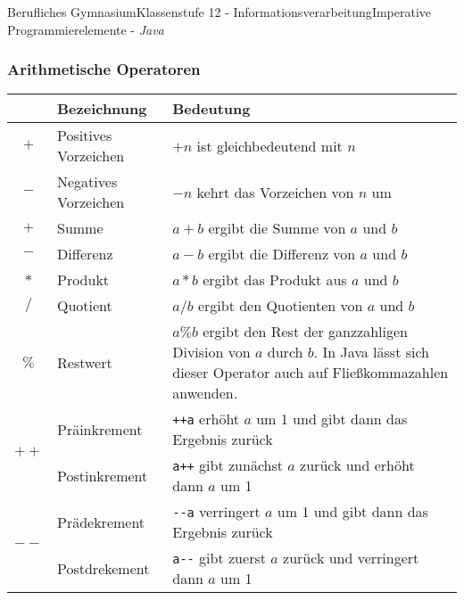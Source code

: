 \documentclass[oneside,openany,headings=optiontotoc,11pt,numbers=noenddot]{article}
\begin{document}
\begin{worksheet}{Berufliches Gymnasium}{Klassenstufe 12 - Informationsverarbeitung}{Imperative Programmierelemente - \textit{Java}}
		\subsubsection{Arithmetische Operatoren}
		\begin{tabularx}{\textwidth}{|c|l|X|}
			\hline
			& \textbf{Bezeichnung} & \textbf{Bedeutung}\\
			\hline
			\(+\) & Positives Vorzeichen & \(+ n\) ist gleichbedeutend mit \(n\)\\
			\hline
			\(-\) & Negatives Vorzeichen & \(- n\) kehrt das Vorzeichen von \(n\) um\\
			\hline
			\(+\) & Summe & \(a + b\) ergibt die Summe von \(a\) und \(b\)\\
			\hline
			\(-\) & Differenz & \(a - b\) ergibt die Differenz von \(a\) und \(b\)\\
			\hline
			\(*\) & Produkt & \(a * b\) ergibt das Produkt aus \(a\) und \(b\)\\
			\hline
			\(/\) & Quotient & \(a / b\) ergibt den Quotienten von \(a\) und \(b\)\\
			\hline
			\(\%\) & Restwert & \(a \% b\) ergibt den Rest der ganzzahligen Division von \(a\) durch \(b\). In Java lässt sich dieser Operator auch auf Fließkommazahlen anwenden.\\
			\hline
			\multirow{2}{*}{\(++\)} & Präinkrement & {\lstinline[style=JavaInputStyle]{++a}} erhöht \(a\) um 1 und gibt dann das Ergebnis zurück\\
			& Postinkrement & {\lstinline[style=JavaInputStyle]{a++}} gibt zunächst \(a\) zurück und erhöht dann \(a\) um 1\\
			\hline
			\multirow{2}{*}{\(--\)} & Prädekrement & {\lstinline[style=JavaInputStyle]{--a}} verringert \(a\) um 1 und gibt dann das Ergebnis zurück\\
			& Postdrekement & {\lstinline[style=JavaInputStyle]{a--}} gibt zuerst \(a\) zurück und verringert dann \(a\) um 1\\
			\hline
		\end{tabularx}

\end{worksheet}
\end{document}
